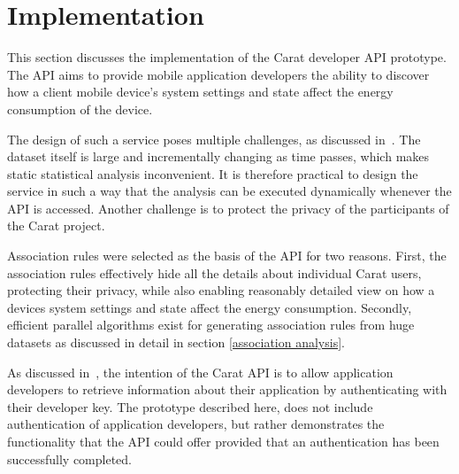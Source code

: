 \section{Implementation}

This section discusses the implementation of the Carat developer API prototype. The API aims to provide mobile application developers the ability to discover how a client mobile device's system settings and state affect the energy consumption of the device.

The design of such a service poses multiple challenges, as discussed in~\cite{7840871}. The dataset itself is large and incrementally changing as time passes, which makes static statistical analysis inconvenient. It is therefore practical to design the service in such a way that the analysis can be executed dynamically whenever the API is accessed. Another challenge is to protect the privacy of the participants of the Carat project.

Association rules were selected as the basis of the API for two reasons. First, the association rules effectively hide all the details about individual Carat users, protecting their privacy, while also enabling reasonably detailed view on how a devices system settings and state affect the energy consumption. Secondly, efficient parallel algorithms exist for generating association rules from huge datasets as discussed in detail in section \ref{association analysis}.

As discussed in~\cite{7840871}, the intention of the Carat API is to allow application developers to retrieve information about their application by authenticating with their developer key. The prototype described here, does not include authentication of application developers, but rather demonstrates the functionality that the API could offer provided that an authentication has been successfully completed. 

